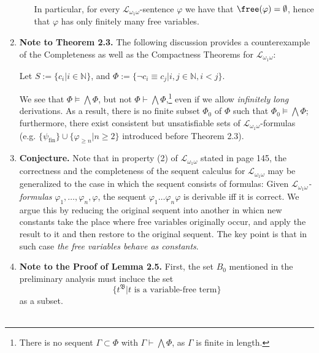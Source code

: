 \begin{enumerate}[1.]
\begin{enumerate}
\\
In particular, for every $\mathcal{L}_{\omega_1\omega}$-sentence $\varphi$ we have that $\free(\varphi) = \emptyset$, hence that $\varphi$ has only finitely many free variables.
\end{enumerate}
%
\item \textbf{Note to Theorem 2.3.} The following discussion provides a counterexample of the Completeness as well as the Compactness Theorems for $\mathcal{L}_{\omega_1\omega}$:
\begin{center}
Let $S := \{ c_i | i \in \mathbb{N} \}$, and $\Phi := \{ \neg c_i \equiv c_j | i, j \in \mathbb{N}, i < j \}$.
\end{center}
We see that $\Phi \models \bigwedge \Phi$, but not $\Phi \vdash \bigwedge \Phi$,\footnote{There is no sequent $\Gamma \subset \Phi$ with $\Gamma \vdash \bigwedge \Phi$, as $\Gamma$ is finite in length.} even if we allow \emph{infinitely long} derivations. As a result, there is no finite subset $\Phi_0$ of $\Phi$ such that $\Phi_0 \models \bigwedge \Phi$; furthermore, there exist consistent but unsatisfiable sets of $\mathcal{L}_{\omega_1\omega}$-formulas (e.g. $\{ \psi_\mathrm{fin} \} \cup \{ \varphi_{\geq n} | n \geq 2 \}$ introduced before Theorem 2.3).
%
\item \textbf{Conjecture.} Note that in property (2) of $\mathcal{L}_{\omega_1\omega}$ stated in page 145, the correctness and the completeness of the sequent calculus for $\mathcal{L}_{\omega_1\omega}$ may be generalized to the case in which the sequent consists of formulas: Given \emph{$\mathcal{L}_{\omega_1\omega}$-formulas} $\varphi_1, \ldots, \varphi_n, \varphi$, the sequent $\varphi_1 \ldots \varphi_n \varphi$ is derivable iff it is correct. We argue this by reducing the original sequent into another in whicn new constants take the place where free variables originally occur, and apply the result to it and then restore to the original sequent. The key point is that in such case \emph{the free variables behave as constants}.
%
\item \textbf{Note to the Proof of Lemma 2.5.} First, the set $B_0$ mentioned in the preliminary analysis must incluce the set
\[
\{ t^\mathfrak{B} | \mbox{$t$ is a variable-free term} \}
\]
as a subset.\\
\\

\end{enumerate}
